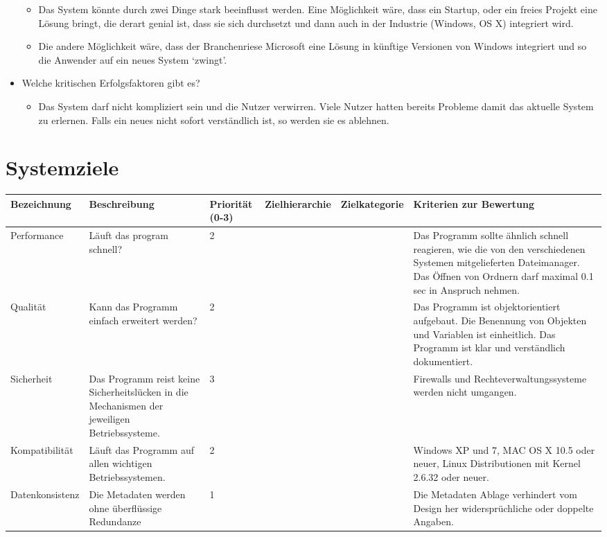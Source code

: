 \documentclass[10pt,paper=a4,final]{scrartcl}
\begin{document}
\begin{itemize}
\begin{itemize}
      \item Das System könnte durch zwei Dinge stark beeinflusst werden. Eine Möglichkeit wäre, dass ein Startup, oder ein freies Projekt eine Lösung bringt, die derart genial ist, dass sie sich durchsetzt und dann auch in der Industrie (Windows, OS X) integriert wird.
      \item Die andere Möglichkeit wäre, dass der Branchenriese Microsoft eine Lösung in künftige Versionen von Windows integriert und so die Anwender auf ein neues System ‘zwingt’.
    \end{itemize}
  \item Welche kritischen Erfolgsfaktoren gibt es?
    \begin{itemize}
      \item Das System darf nicht kompliziert sein und die Nutzer verwirren. Viele Nutzer hatten bereits Probleme damit das aktuelle System zu erlernen. Falls ein neues nicht sofort verständlich ist, so werden sie es ablehnen.
    \end{itemize}
\end{itemize}
\newpage
\section{Systemziele}
\begin{tabular}{ |l|p{2.5cm}|l|l|l|p{4.0cm}| }
  \hline
  \bf Bezeichnung & \bf Beschreibung & \bf Priorit\"at (0-3) & \bf Zielhierarchie & \bf Zielkategorie & \bf Kriterien zur Bewertung \\ \hline
  Performance & L\"auft das program schnell? & 2 & & & Das Programm sollte ähnlich schnell reagieren, wie die von den verschiedenen Systemen mitgelieferten Dateimanager.
  Das \"Offnen von Ordnern darf maximal 0.1 sec in Anspruch nehmen. \\ \hline
  Qualit\"at & Kann das Programm einfach erweitert werden? & 2 & & & Das Programm ist objektorientiert aufgebaut.
  Die Benennung von Objekten und Variablen ist einheitlich.
  Das Programm ist klar und verständlich dokumentiert. \\ \hline
  Sicherheit & Das Programm reist keine Sicherheitslücken in die Mechanismen der jeweiligen Betriebssysteme. & 3 & & & Firewalls und Rechteverwaltungssysteme werden nicht umgangen. \\ \hline
  Kompatibilit\"at & Läuft das Programm auf allen wichtigen Betriebssystemen. & 2 & & & Windows XP und 7, MAC OS X 10.5 oder neuer, Linux Distributionen mit Kernel 2.6.32 oder neuer. \\ \hline
  Datenkonsistenz & Die Metadaten werden ohne überflüssige Redundanze & 1 & & & Die Metadaten Ablage verhindert vom Design her widersprüchliche oder doppelte Angaben. \\ \hline
\end{tabular}
\end{document}
